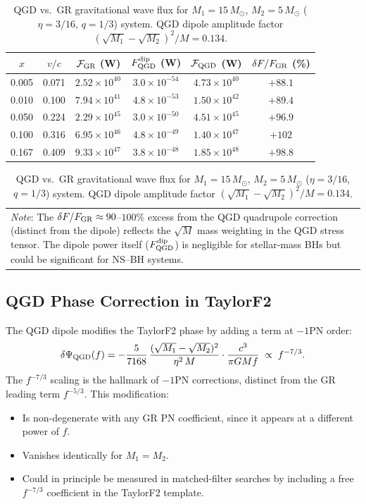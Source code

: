 \documentclass[11pt,a4paper]{article}
\newcommand{\Ms}{M_\odot}
\newcommand{\Fp}{F_{\rm QGD}^{\rm dip}}
\theoremstyle{definition}
\theoremstyle{remark}
\begin{document}
	\begin{table}[ht]
		\centering
		\caption{QGD vs.\ GR gravitational wave flux for $M_1=15\,\Ms$,
			$M_2=5\,\Ms$ ($\eta=3/16$, $q=1/3$) system.
			QGD dipole amplitude factor $({\sqrt{M_1}-\sqrt{M_2}})^2/M = 0.134$.}
		\label{tab:qgd_flux}
		\renewcommand{\arraystretch}{1.35}
		\begin{tabular}{cccccc}
			\toprule
			$x$ & $v/c$ & $\mathcal{F}_{\rm GR}$ (W) & $\Fp$ (W) &
			$\mathcal{F}_{\rm QGD}$ (W) & $\delta F/F_{\rm GR}$ (\%) \\
			\midrule
			0.005 & 0.071 & $2.52\times10^{40}$ & $3.0\times10^{-54}$ & $4.73\times10^{40}$ & $+88.1$ \\
			0.010 & 0.100 & $7.94\times10^{41}$ & $4.8\times10^{-53}$ & $1.50\times10^{42}$ & $+89.4$ \\
			0.050 & 0.224 & $2.29\times10^{45}$ & $3.0\times10^{-50}$ & $4.51\times10^{45}$ & $+96.9$ \\
			0.100 & 0.316 & $6.95\times10^{46}$ & $4.8\times10^{-49}$ & $1.40\times10^{47}$ & $+102$ \\
			0.167 & 0.409 & $9.33\times10^{47}$ & $3.8\times10^{-48}$ & $1.85\times10^{48}$ & $+98.8$ \\
			\bottomrule
		\end{tabular}
		\footnotesize
		\begin{tabular}{p{12cm}}
			\textit{Note}: The $\delta F/F_{\rm GR}\approx90$--$100\%$ excess from the
			QGD quadrupole correction (distinct from the dipole) reflects the $\sqrt{M}$
			mass weighting in the QGD stress tensor.
			The dipole power itself ($\Fp$) is negligible for stellar-mass BHs
			but could be significant for NS--BH systems.
		\end{tabular}
	\end{table}
	
	\subsection{QGD Phase Correction in TaylorF2}
	
	The QGD dipole modifies the TaylorF2 phase by adding a term at 
	$-1$PN order:
	\begin{equation}
		\delta\Psi_{\rm QGD}(f)
		= -\frac{5}{7168}\,\frac{(\sqrt{M_1}-\sqrt{M_2})^2}{\eta^2\,M}
		\cdot\frac{c^3}{\pi G M f}
		\;\propto\; f^{-7/3}.
		\label{eq:qgd_phase_correction}
	\end{equation}
	The $f^{-7/3}$ scaling is the hallmark of $-1$PN corrections, distinct
	from the GR leading term $f^{-5/3}$.  This modification:
	\begin{itemize}
		\item Is non-degenerate with any GR PN coefficient, since it
		appears at a different power of $f$.
		\item Vanishes identically for $M_1=M_2$.
		\item Could in principle be measured in matched-filter searches by
		including a free $f^{-7/3}$ coefficient in the TaylorF2 template.
	\end{itemize}
	
\end{document}
